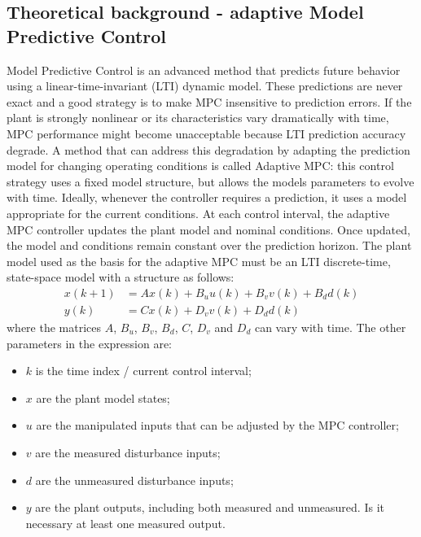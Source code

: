 \documentclass[conference, 11pt]{IEEEtran}
\begin{document}
\subsection{Theoretical background - adaptive Model Predictive Control}
Model Predictive Control is an advanced method that predicts future behavior using a linear-time-invariant (LTI) dynamic model. These predictions are never exact and a good strategy is
to make MPC insensitive to prediction errors. If the plant is strongly nonlinear or its characteristics vary dramatically with time, MPC performance might become unacceptable because LTI prediction accuracy degrade. A method that can address this degradation by adapting the prediction model for changing operating conditions is called Adaptive MPC: this control strategy uses a fixed model structure, but allows the models parameters to evolve with time. Ideally, whenever the controller requires a prediction, it uses a model appropriate for the current conditions. At each control interval, the adaptive MPC controller updates the plant model and nominal conditions. Once updated, the model and conditions remain constant over the prediction horizon. The plant model used as the basis for the adaptive MPC must be an LTI discrete-time, state-space model with a structure as follows:
\begin{equation*}
\label{eqn:Adaptive_MPC_plant_discrete}
\begin{aligned}
x(k+1)&=Ax(k)+ B_u u(k)+B_v v(k)+B_d d(k)\\
y(k)&=Cx(k) + D_v v(k)+ D_d d(k)
\end{aligned}
\end{equation*}
where the matrices $A$, $B_u$, $B_v$, $B_d$, $C$, $D_v$ and $D_d$ can vary with time. The other parameters in the expression are:
\begin{itemize}
	\item $k$ is the time index / current control interval;
	\item $x$ are the plant model states;
	\item $u$ are the manipulated inputs that can be adjusted by the MPC controller;
	\item $v$ are the measured disturbance inputs;
	\item $d$ are the unmeasured disturbance inputs;
	\item $y$ are the plant outputs, including both measured and unmeasured. Is it necessary at least one measured output.
\end{itemize}
\end{document}
